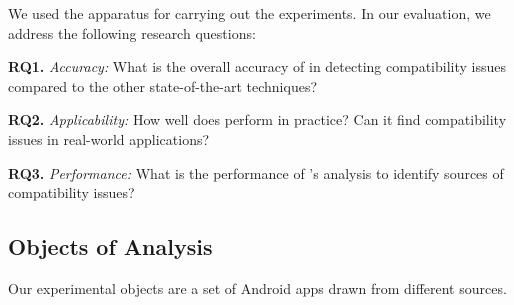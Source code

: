 We used the \@approach apparatus for carrying out the experiments. In our evaluation, we address the following research questions:


\textbf{RQ1.} \textit{Accuracy:} What is the overall accuracy of \@approach in detecting compatibility issues compared to the other state-of-the-art techniques?

\textbf{RQ2.} \textit{Applicability:} How well does \@approach perform in practice? Can it find compatibility issues in real-world applications?

\textbf{RQ3.} \textit{Performance:} What is the performance of \@approach's analysis to identify sources of compatibility issues?

\subsection{Objects of Analysis}

Our experimental objects are a set of Android apps
drawn from different sources.  

